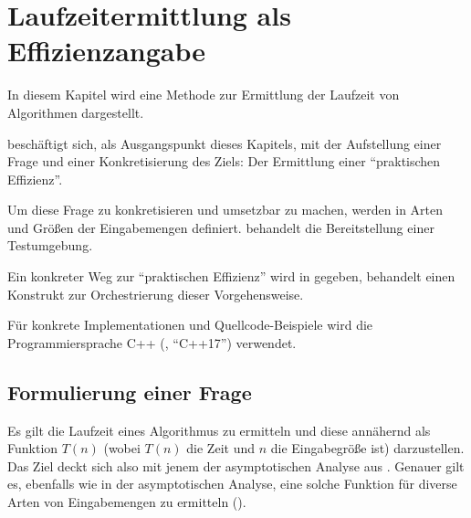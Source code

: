 \chapter{Laufzeitermittlung als Effizienzangabe}
\label{cha:praktische-effizienz}

In diesem Kapitel wird eine Methode zur Ermittlung der Laufzeit von Algorithmen dargestellt.

 beschäftigt sich, als Ausgangspunkt dieses Kapitels, mit der Aufstellung einer Frage und einer Konkretisierung des Ziels: Der Ermittlung einer \enquote{praktischen Effizienz}.

Um diese Frage zu konkretisieren und umsetzbar zu machen, werden in  Arten und Größen der Eingabemengen definiert.  behandelt die Bereitstellung einer Testumgebung.

Ein konkreter Weg zur \enquote{praktischen Effizienz} wird in  gegeben,  behandelt einen Konstrukt zur Orchestrierung dieser Vorgehensweise.

Für konkrete Implementationen und Quellcode-Beispiele wird die Programmiersprache C++ (\cite{ISO-C++17}, \enquote{C++17}) verwendet.


\section{Formulierung einer Frage}
\label{sec:runtime-question}

Es gilt die Laufzeit eines Algorithmus zu ermitteln und diese annähernd als Funktion $T(n)$ (wobei $T(n)$ die Zeit und $n$ die Eingabegröße ist) darzustellen. Das Ziel deckt sich also mit jenem der asymptotischen Analyse aus . Genauer gilt es, ebenfalls wie in der asymptotischen Analyse, eine solche Funktion für diverse Arten von Eingabemengen zu ermitteln (\cite[27]{mcg2012}).

